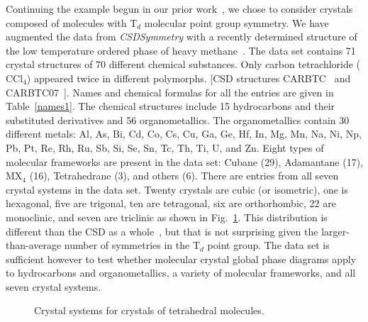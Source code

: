 \documentclass[preprint]{iucr}              %
\begin{document}
Continuing the example begun in our prior work~\cite{Mettes04}, we
chose to consider crystals composed of molecules with T$_d$
molecular point group symmetry.  We have augmented the data from
\emph{CSDSymmetry} with a recently determined structure of the low
temperature ordered phase of heavy methane~\cite{Neumann03}.  The
data set contains 71 crystal structures of 70 different chemical
substances.  Only carbon tetrachloride ($\mathrm{CCl}_4$) appeared
twice in different polymorphs. [CSD structures
CARBTC~\cite{Piermarini73} and CARBTC07~\cite{Cohen79}]. Names and
chemical formulas for all the entries are given in
Table~\ref{names1}. The chemical structures include 15 hydrocarbons
and their substituted derivatives and 56 organometallics. The
organometallics contain 30 different metals: Al, As, Bi, Cd, Co, Cs,
Cu, Ga, Ge, Hf, In, Mg, Mn, Na, Ni, Np, Pb, Pt, Re, Rh, Ru, Sb, Si,
Se, Sn, Tc, Th, Ti, U, and Zn. Eight types of molecular frameworks
are present in the data set: Cubane (29), Adamantane (17), MX$_4$
(16), Tetrahedrane (3), and others (6). There are entries from all
seven crystal systems in the data set. Twenty crystals are cubic (or
isometric), one is hexagonal, five are trigonal, ten are tetragonal,
six are orthorhombic, 22 are monoclinic, and seven are triclinic as
shown in Fig.~\ref{distro}. This distribution is different than the
CSD as a whole~\cite{Bauer92}, but that is not surprising given the
larger-than-average number of symmetries in the T$_d$ point group.
The data set is sufficient however to test whether molecular crystal
global phase diagrams apply to hydrocarbons and organometallics, a
variety of molecular frameworks, and all seven crystal systems.

\begin{figure}
\begin{center}
\caption[Distribution of experimental structures among the seven
crystal systems.]{Crystal systems for crystals of tetrahedral
molecules.\label{distro}}
\end{center}
\end{figure}
\end{document}

